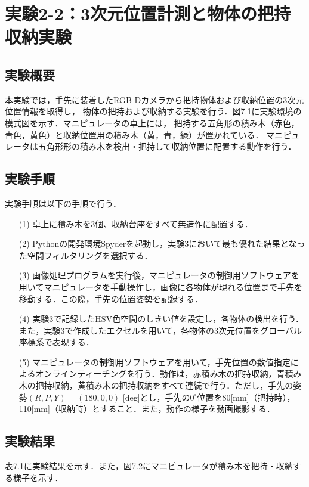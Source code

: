 \section{実験2-2：3次元位置計測と物体の把持収納実験}

\subsection{実験概要}
本実験では，手先に装着したRGB-Dカメラから把持物体および収納位置の3次元位置情報を取得し，
物体の把持および収納する実験を行う．図7.1に実験環境の模式図を示す．マニピュレータの卓上には，
把持する五角形の積み木（赤色，青色，黄色）と収納位置用の積み木（黄，青，緑）が置かれている．
マニピュレータは五角形形の積み木を検出・把持して収納位置に配置する動作を行う．

\subsection{実験手順}
実験手順は以下の手順で行う．

\begin{enumerate}
  \item[(1)] 卓上に積み木を3個、収納台座をすべて無造作に配置する．
  \item[(2)] Pythonの開発環境Spyderを起動し，実験3において最も優れた結果となった空間フィルタリングを選択する．
  \item[(3)] 画像処理プログラムを実行後，マニピュレータの制御用ソフトウェアを用いてマニピュレータを手動操作し，画像に各物体が現れる位置まで手先を移動する．この際，手先の位置姿勢を記録する．
  \item[(4)] 実験3で記録したHSV色空間のしきい値を設定し，各物体の検出を行う．また，実験3で作成したエクセルを用いて，各物体の3次元位置をグローバル座標系で表現する．
  \item[(5)] マニピュレータの制御用ソフトウェアを用いて，手先位置の数値指定によるオンラインティーチングを行う．動作は，赤積み木の把持収納，青積み木の把持収納，黄積み木の把持収納をすべて連続で行う．ただし，手先の姿勢$(R, P, Y) = (180, 0, 0)$ [deg]とし，手先の$0^{\circ}$位置を80[mm]（把持時），110[mm]（収納時）とすること．また，動作の様子を動画撮影する．
\end{enumerate}

\subsection{実験結果}
表7.1に実験結果を示す．また，図7.2にマニピュレータが積み木を把持・収納する様子を示す．

